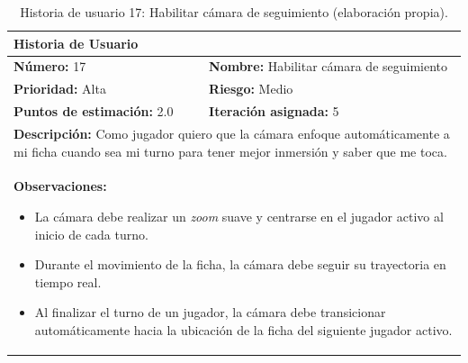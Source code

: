 \begin{table}[H]
\centering
\caption{Historia de usuario 17: Habilitar cámara de seguimiento (elaboración propia).\label{tab:hu17}}
\renewcommand{\arraystretch}{1.5}
\begin{tabular}{|p{}|p{}|}
\hline
\multicolumn{2}{|l|}{\textbf{Historia de Usuario}} \\
\hline
\textbf{Número:} 17 & \textbf{Nombre:} Habilitar cámara de seguimiento \\
\hline
\textbf{Prioridad:} Alta & \textbf{Riesgo:} Medio \\
\hline
\textbf{Puntos de estimación:} 2.0 & \textbf{Iteración asignada:} 5 \\
\hline
\multicolumn{2}{|p{0.945\textwidth}|}{\textbf{Descripción:} Como jugador quiero que la cámara enfoque automáticamente a mi ficha cuando sea mi turno para tener mejor inmersión y saber que me toca.} \\
\hline
\multicolumn{2}{|p{0.945\textwidth}|}{\textbf{Observaciones:}
\vspace{-0.5em}
\begin{itemize}
    \setlength\itemsep{0em}
    \item La cámara debe realizar un \textit{zoom} suave y centrarse en el jugador activo al inicio de cada turno.
    \item Durante el movimiento de la ficha, la cámara debe seguir su trayectoria en tiempo real.
    \item Al finalizar el turno de un jugador, la cámara debe transicionar automáticamente hacia la ubicación de la ficha del siguiente jugador activo.
\end{itemize}
\vspace{-1em}
} \\
\hline
\end{tabular}
\end{table}

